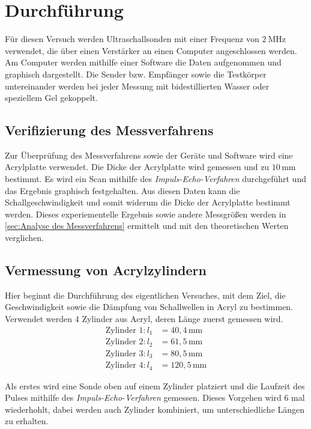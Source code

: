 \section{Durchführung}
\label{sec:Durchführung}
Für diesen Versuch werden Ultraschallsonden mit einer Frequenz von $\qty{2}{\mega\hertz}$ verwendet,
die über einen Verstärker an einen Computer angeschlossen werden.
Am Computer werden mithilfe einer Software die Daten aufgenommen und graphisch dargestellt.
Die Sender bzw. Empfänger sowie die Testkörper untereinander werden bei jeder Messung mit bidestillierten Wasser oder
speziellem Gel gekoppelt.

\subsection{Verifizierung des Messverfahrens}

Zur Überprüfung des Messverfahrens sowie der Geräte und Software wird eine Acrylplatte verwendet.
Die Dicke der Acrylplatte wird gemessen und zu $10\,\unit{\milli\metre}$ bestimmt.
Es wird ein Scan mithilfe des \textit{Impuls-Echo-Verfahren} durchgeführt und das Ergebnis graphisch festgehalten.
Aus diesen Daten kann die Schallgeschwindigkeit und somit widerum die Dicke der Acrylplatte bestimmt werden.
Dieses experiementelle Ergebnis sowie andere Messgrößen werden in \autoref{sec:Analyse des Messverfahrens} ermittelt
und mit den theoretischen Werten verglichen.

\subsection{Vermessung von Acrylzylindern}

Hier beginnt die Durchführung des eigentlichen Versuches, mit dem Ziel, die Geschwindigkeit sowie die Dämpfung
von Schallwellen in Acryl zu bestimmen.
Verwendet werden 4 Zylinder aus Acryl, deren Länge zuerst gemessen wird.
\begin{align*}
    \text{Zylinder 1:}\,l_1&=40,4\,\unit{\milli\metre} \\
    \text{Zylinder 2:}\,l_2&=61,5\,\unit{\milli\metre} \\
    \text{Zylinder 3:}\,l_3&=80,5\,\unit{\milli\metre} \\
    \text{Zylinder 4:}\,l_4&=120,5\,\unit{\milli\metre}
\end{align*}

Als erstes wird eine Sonde oben auf einem Zylinder platziert und die Laufzeit des Pulses mithilfe des \textit{Impuls-Echo-Verfahren}
gemessen. Dieses Vorgehen wird 6 mal wiederhohlt, dabei werden auch Zylinder kombiniert, um unterschiedliche Längen zu erhalten.

